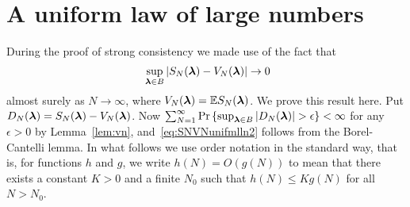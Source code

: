 \documentclass[aap]{imsart}
\newcommand{\prob}{\operatorname{Pr}}
\newcommand{\expect}{{\mathbb E}}
\newcommand{\abs}[1]{\left\vert #1 \right\vert}
\newcommand{\sabs}[1]{\vert #1 \vert}
\begin{document}
\appendix



\section{A uniform law of large numbers} \label{app:uniform-law-large}

During the proof of strong consistency we made use of the fact that
\begin{equation}~\label{eq:SNVNunifmlln2}
\sup_{\lambdabf \in B}\sabs{S_N(\lambdabf) - V_N(\lambdabf)} \rightarrow 0
\end{equation}
almost surely as $N\rightarrow\infty$, where $V_N(\lambdabf) = \expect S_N(\lambdabf)$.  We prove this result here.  Put $D_N(\boldsymbol{\lambda}) = S_N(\boldsymbol{\lambda}) - V_N(\boldsymbol{\lambda})$.  Now $\sum_{N=1}^\infty \prob \left\{ \sup_{\lambdabf \in B}\abs{ D_N(\lambdabf) } > \epsilon \right\} < \infty$ for any $\epsilon > 0$ by Lemma~\ref{lem:vn}, and~\eqref{eq:SNVNunifmlln2} follows from the Borel-Cantelli lemma.   In what follows we use order notation in the standard way, that is, for functions $h$ and $g$, we write $h(N) = O(g(N))$ to mean that there exists a constant $K > 0$ and a finite $N_0$ such that $h(N) \leq K g(N)$ for all $N > N_0$.
\end{document}
